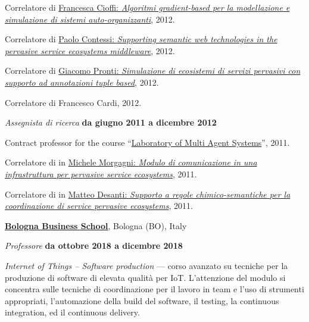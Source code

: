\documentclass[10pt]{article}
\newenvironment{outerlist}[1][\enskip\textbullet]%
        {\begin{itemize}[#1]}{\end{itemize}%
         \vspace{-.6\baselineskip}}
\newenvironment{innerlist}[1][\enskip\textbullet]%
        {\begin{compactitem}[#1]}{\end{compactitem}}
\newcommand{\halfblankline}{\quad\vspace{-0.5\baselineskip}\pagebreak[3]}
\begin{document}
\begin{outerlist}
\begin{innerlist}
      \item Correlatore di \href{http://amslaurea.unibo.it/4088/}{Francesca Cioffi: \textit{Algoritmi gradient-based per la modellazione e simulazione di sistemi auto-organizzanti}}, 2012.
      \item Correlatore di \href{http://amslaurea.unibo.it/4074/}{Paolo Contessi: \textit{Supporting semantic web technologies in the pervasive service ecosystems middleware}}, 2012.
      \item Correlatore di \href{http://www.alice.unibo.it/xwiki/bin/view/Theses/ProntiAlchemistSapere/}{Giacomo Pronti: \textit{Simulazione di ecosistemi di servizi pervasivi con supporto ad annotazioni tuple based}}, 2012.
      \item Correlatore di Francesco Cardi, 2012.
    \end{innerlist}
\item[] \textit{Assegnista di ricerca} \hfill \textbf{da giugno 2011 a dicembre 2012}
    \begin{innerlist}
      \item Contract professor for the course ``\href{http://apice.unibo.it/xwiki/bin/view/Courses/SmaLm1112Lab}{Laboratory of Multi Agent Systems}'', 2011.
      \item Correlatore di in \href{http://apice.unibo.it/xwiki/bin/view/Theses/SapereComm}{Michele Morgagni: \textit{Modulo di comunicazione in una infrastruttura per pervasive service ecosystems}}, 2011.
      \item Correlatore di in \href{http://www.alice.unibo.it/xwiki/bin/view/Theses/LSAspace}{Matteo Desanti: \textit{Supporto a regole chimico-semantiche per la coordinazione di service pervasive ecosystems}}, 2011.
    \end{innerlist}
\halfblankline
\end{outerlist}

\href{https://www.bbs.unibo.eu/hp/}{\textbf{Bologna Business School}}, Bologna (BO), Italy
\begin{outerlist}
\item[] \textit{Professore} \hfill \textbf{da ottobre 2018 a dicembre 2018}
    \begin{innerlist}
        \item \textit{Internet of Things -- Software production} --- corso avanzato su 
tecniche per la produzione di software di elevata qualità per IoT. L'attenzione del modulo 
si concentra sulle tecniche di coordinazione per il lavoro in team e l'uso di strumenti 
appropriati, l'automazione della build del software, il testing, la continuous integration, ed il 
continuous delivery.
\end{innerlist}
\halfblankline
\end{outerlist}
\end{document}
